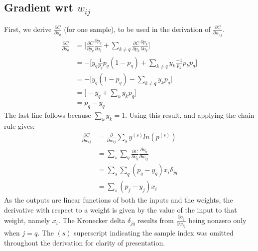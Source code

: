 \documentclass{article}
\begin{document}
   \subsection{Gradient wrt $w_{ij}$}
   First, we derive $\frac{ \partial C}{ \partial o_q }$ (for one sample), to be used in the derivation of
   $\frac{ \partial C}{ \partial w_{ij} }$.
      \begin{equation*} \begin{split}
        \frac{ \partial C}{ \partial o_q }
           &= \bigg[   \frac{ \partial C}{ \partial p_q } \frac{ \partial p_q}{ \partial o_q }    +   \sum_{k \neq q} \frac{ \partial C}{ \partial p_k } \frac{ \partial p_k}{ \partial o_q }  \bigg]  \\
           &= - \bigg[    y_q \frac{1}{p_q} p_q (1 - p_q)  +   \sum_{k \neq q} y_k \frac{-1}{p_k} p_k p_q  \bigg]  \\
           &= - \bigg[    y_q (1 - p_q)  -  \sum_{k \neq q} y_k p_q       \bigg]   \\
           &=   \bigg[    - y_q  +  \sum_k y_k p_q   \bigg]  \\
           &=  p_q - y_q
      \end{split} \end{equation*}
   The last line follows because $\sum_k y_k = 1$. Using this result, and applying the chain rule
   gives:
      \begin{equation*} \begin{split}
        \frac{ \partial C}{ \partial w_{ij} }
           &= \frac{ \partial }{ \partial w_{ij} } \sum_{s} y^{(s)} ln(p^{(s)}) \\
           &= \sum_s \sum_q  \frac{ \partial C}{ \partial o_q } \frac{ \partial o_q }{ \partial w_{ij} } \\
           &= \sum_s \sum_q ( p_q - y_q ) x_i \delta_{jq}  \\
           &= \sum_s ( p_j - y_j ) x_i
      \end{split} \end{equation*}
   As the outputs are linear functions of both the inputs and the weights, the derivative
   with respect to a weight is given by the value of the input to that weight, namely $x_i$.
   The Kronecker delta $\delta_{jq}$ results from $ \frac{ \partial o_q }{ \partial w_{ij} } $
   being nonzero only when $j = q$.
   The $(s)$ superscript indicating the sample index was omitted throughout the derivation for clarity of presentation.
\end{document}
